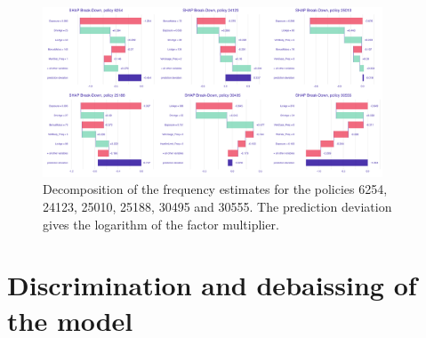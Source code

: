 \documentclass[
]{article}
\begin{document}
\begin{figure}[h]
    \centering
    \includegraphics[width=0.9\textwidth]{figures/freq_shap_breakdown.png}
    \caption{Decomposition of the frequency estimates for the policies 6254, 24123, 25010, 25188, 30495 and 30555. The prediction deviation gives the logarithm of the factor multiplier.}
\end{figure}

\newpage

\hypertarget{discrimination-and-debaissing-of-the-model}{%
\section{Discrimination and debaissing of the
model}\label{discrimination-and-debaissing-of-the-model}}
\end{document}

